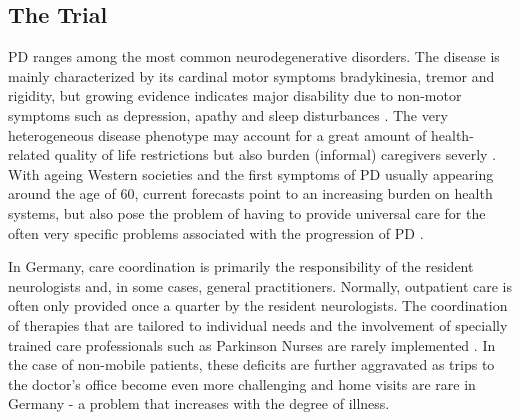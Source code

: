 \documentclass[number,12pt,review]{elsarticle}
\begin{document}
\label{backsec}

\subsection{The Trial}

\label{trialsec}

\ac{PD} ranges among the most common neurodegenerative disorders. The disease is mainly characterized by its cardinal motor symptoms bradykinesia, tremor and rigidity, but growing evidence indicates major disability due to non-motor symptoms such as depression, apathy and sleep disturbances \citet{Bloem2021-ov}. The very heterogeneous disease phenotype may account for a great amount of health-related quality of life restrictions but also burden (informal) caregivers severly \citet{Kalia2015-ty}. With ageing Western societies and the first symptoms of \ac{PD} usually appearing around the age of 60, current forecasts point to an increasing burden on health systems, but also pose the problem of having to provide universal care for the often very specific problems associated with the progression of \ac{PD} \citet{Heinzel2018-ff, Dorsey2018-mc}.

In Germany, care coordination is primarily the responsibility of the resident neurologists and, in some cases, general practitioners. Normally, outpatient care is often only provided once a quarter by the resident neurologists. The coordination of therapies that are tailored to individual needs and the involvement of specially trained care professionals such as Parkinson Nurses are rarely implemented  \citet{Prell2020-bc}.
In the case of non-mobile patients, these deficits are further aggravated as trips to the doctor's office become even more challenging and home visits are rare in Germany \citet{Stangl2020} - a problem that increases with the degree of illness.
\end{document}
